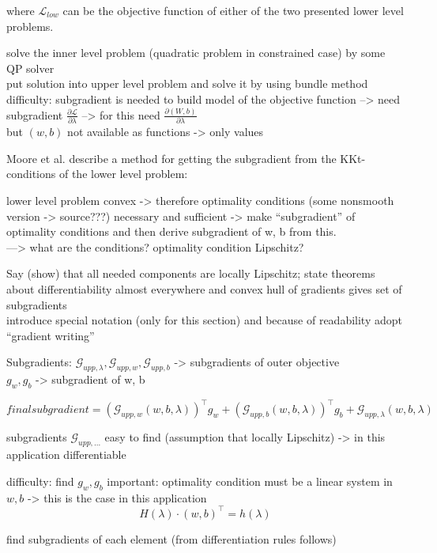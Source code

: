 where \(\mathcal{L}_{low}\) can be the objective function of either of the two presented lower level problems.



solve the inner level problem (quadratic problem in constrained case) by some QP solver \\
put solution into upper level problem and solve it by using bundle method \\
difficulty: subgradient is needed to build model of the objective function --> need subgradient \(\frac{\partial \mathcal{L}}{\partial \lambda}\) --> for this need \(\frac{\partial (W,b)}{\partial \lambda}\) \\
but \((w,b)\) not available as functions -> only values

Moore et al. \cite{Moore2011} describe a method for getting the subgradient from the KKt-conditions of the lower level problem:

lower level problem convex -> therefore optimality conditions (some nonsmooth version -> source???) necessary and sufficient -> make ``subgradient'' of optimality conditions and then derive subgradient of w, b from this. \\
---> what are the conditions? optimality condition Lipschitz? 

Say (show) that all needed components are locally Lipschitz; state theorems about differentiability almost everywhere and convex hull of gradients gives set of subgradients\\
introduce special notation (only for this section) and because of readability adopt ``gradient writing''

Subgradients:
\(\mathcal{G}_{upp,\lambda}, \mathcal{G}_{upp,w},\mathcal{G}_{upp,b}\) -> subgradients of outer objective \\
\(g_w, g_b\) -> subgradient of w, b

\[ final subgradient = \left(\mathcal{G}_{upp,w}(w,b,\lambda)\right)^{\top}g_w+\left(\mathcal{G}_{upp,b}(w,b,\lambda)\right)^{\top}g_b+\mathcal{G}_{upp,\lambda}(w,b,\lambda) 
\label{subgr_upp}\]

subgradients \(\mathcal{G}_{upp,...}\) easy to find (assumption that locally Lipschitz) -> in this application differentiable

difficulty: find \(g_w, g_b\)
important: optimality condition must be a linear system in \(w,b\) -> this is the case in this application
\[ H(\lambda)\cdot (w,b)^{\top} = h(\lambda) \]

find subgradients of each element (from differentiation rules follows)

